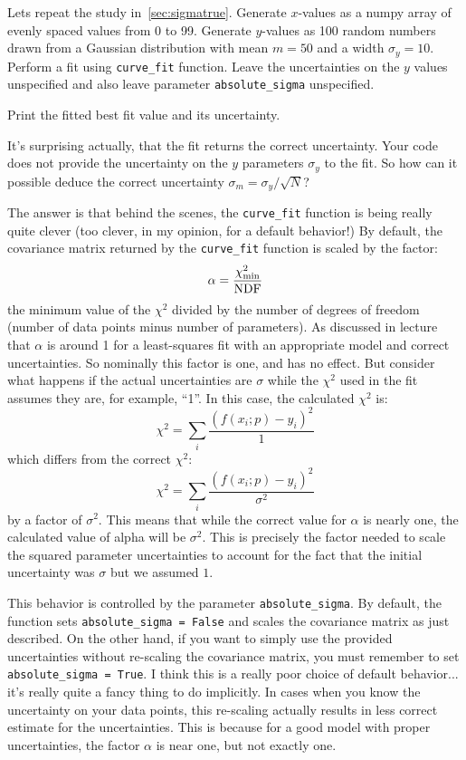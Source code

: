 Lets repeat the study in~\ref{sec:sigmatrue}. Generate $x$-values as a numpy array of evenly spaced values from 0 to 99. Generate $y$-values as 100 random numbers drawn from a Gaussian distribution with mean $m = 50$ and a width $\sigma_y =10$.  Perform a fit using {\tt curve{\_}fit} function.  Leave the uncertainties on the $y$ values
unspecified and also leave parameter {\tt absolute{\_}sigma} unspecified. 

\begin{print} Print the fitted best fit value and its uncertainty. \end{print}

It's surprising actually, that the fit returns the correct
uncertainty.  Your code does not provide  the uncertainty on the $y$ parameters $\sigma_y$ to
the fit.  So how can it possible deduce the correct uncertainty
$\sigma_m = \sigma_y / \sqrt{N}$?

The answer is that behind the scenes, the {\tt curve{\_}fit} function
is being really quite clever (too clever, in my opinion, for a default
behavior!)  By default, the covariance matrix returned by the 
{\tt curve{\_}fit} function is scaled by the factor:
\begin{displaymath}
\alpha = \frac{\chi^2_{\rm min}}{\rm NDF}
\end{displaymath}
the minimum value of the $\chi^2$ divided by the number of degrees of
freedom (number of data points minus number of parameters).  As discussed in lecture that $\alpha$ is around 1 for a least-squares fit with
an appropriate model and correct uncertainties.  So nominally this
factor is one, and has no effect.  But consider what happens if the
actual uncertainties are $\sigma$ while the $\chi^2$ used in the fit assumes they
are, for example, ``1''.  In this case, the calculated $\chi^2$ is:
\begin{displaymath}
\chi^2 = \sum_i \frac{(f(x_i;p) - y_i) ^2}{1}
\end{displaymath}
which differs from the correct $\chi^2$:
\begin{displaymath}
\chi^2 = \sum_i \frac{(f(x_i;p) - y_i) ^2}{\sigma^2}
\end{displaymath}
by a factor of $\sigma^2$.  This means that while the correct value
for $\alpha$ is nearly one, the calculated value of alpha will be
$\sigma^2$.  This is precisely the factor needed to scale the squared
parameter uncertainties to account for the fact that the initial
uncertainty was $\sigma$ but we assumed $1$.

This behavior is controlled by the parameter {\tt absolute{\_}sigma}.
By default, the function sets {\tt absolute{\_}sigma = False} and
scales the covariance matrix as just described.  On the other hand, if
you want to simply use the provided uncertainties without re-scaling
the covariance matrix, you must remember to set {\tt
  absolute{\_}sigma = True}.  I think this is a really poor choice of
default behavior...  it's really quite a fancy thing to do implicitly.
In cases when you know the uncertainty on your data points, this
re-scaling actually results in less correct estimate for the
uncertainties.  This is because for a good model with proper
uncertainties, the factor $\alpha$ is near one, but not exactly one.

